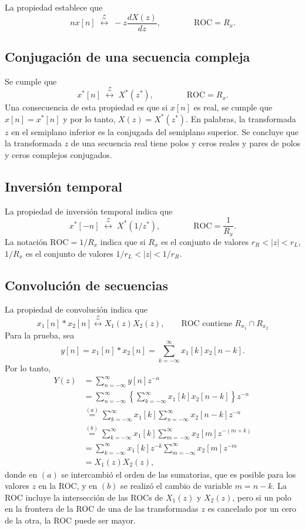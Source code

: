 \documentclass[a4paper]{report}
\begin{document}
La propiedad establece que 
\[
 nx[n]\;\overset{\mathcal{Z}}{\longleftrightarrow}\;-z\frac{dX(z)}{dz},
 \qquad\qquad\textrm{ROC}=R_x.
\]

\subsection{Conjugación de una secuencia compleja}

Se cumple que 
\[
 x^*[n]\;\overset{\mathcal{Z}}{\longleftrightarrow}\;X^*(z^*),
 \qquad\qquad\textrm{ROC}=R_x.
\]
Una consecuencia de esta propiedad es que si \(x[n]\) es real, se cumple que \(x[n]=x^*[n]\) y por lo tanto, \(X(z)=X^*(z^*)\). En palabras, la transformada \(z\) en el semiplano inferior es la conjugada del semiplano superior. Se concluye que la transformada \(z\) de una secuencia real tiene polos y ceros reales y pares de polos y ceros complejos conjugados.

\subsection{Inversión temporal}

La propiedad de inversión temporal indica que 
\[
 x^*[-n]\;\overset{\mathcal{Z}}{\longleftrightarrow}\;X^*(1/z^*),
 \qquad\qquad\textrm{ROC}=\frac{1}{R_x}.
\]
La notación \(\textrm{ROC}=1/R_x\) indica que si \(R_x\) es el conjunto de valores \(r_R<|z|<r_L\), \(1/R_x\) es el conjunto de valores \(1/r_L<|z|<1/r_R\).

\subsection{Convolución de secuencias}

La propiedad de convolución indica que
\[
 x_1[n]*x_2[n]\overset{\mathcal{Z}}{\longleftrightarrow}X_1(z)X_2(z),\qquad\textrm{ROC contiene }R_{x_1}\cap R_{x_2}
\]
Para la prueba, sea 
\[
 y[n]=x_1[n]*x_2[n]=\sum_{k=-\infty}^{\infty}x_1[k]x_2[n-k].
\]
Por lo tanto,
\begin{align*}
 Y(z)&=\sum_{n=-\infty}^{\infty}y[n]z^{-n}\\
  &=\sum_{n=-\infty}^{\infty}\left\lbrace\sum_{k=-\infty}^{\infty}x_1[k]x_2[n-k]\right\rbrace z^{-n}\\
  &\overset{(a)}{=}\sum_{k=-\infty}^{\infty}x_1[k]\sum_{n=-\infty}^{\infty}x_2[n-k] z^{-n}\\
  &\overset{(b)}{=}\sum_{k=-\infty}^{\infty}x_1[k]\sum_{m=-\infty}^{\infty}x_2[m] z^{-(m+k)}\\
  &=\sum_{k=-\infty}^{\infty}x_1[k] z^{-k}\sum_{m=-\infty}^{\infty}x_2[m] z^{-m}\\
  &=X_1(z)X_2(z),
\end{align*}
donde en \((a)\) se intercambió el orden de las sumatorias, que es posible para los valores \(z\) en la ROC, y en \((b)\) se realizó el cambio de variable \(m=n-k\). La ROC incluye la intersección de las ROCs de \(X_1(z)\) y \(X_2(z)\), pero si un polo en la frontera de la ROC de una de las transformadas \(z\) es cancelado por un cero de la otra, la ROC puede ser mayor.
\end{document}

